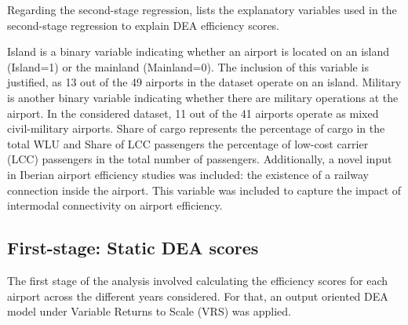 Regarding the second-stage regression,  lists the explanatory variables used in the second-stage regression to explain DEA efficiency scores.

\vspace{-0.2cm}
\begin{table}[h!]
  \begin{center}
        \caption{Summary Statistics for explanatory variables}
    \label{tab:exp_statistics}
  \end{center}
\end{table}
  
\vspace{-0.5cm}
Island is a binary variable indicating whether an airport is located on an island (Island=1) or the
mainland (Mainland=0). The inclusion of this variable is justified, as 13 out of the 49 airports in the
dataset operate on an island. Military is another binary variable indicating whether there are military
operations at the airport. In the considered dataset, 11 out of the 41 airports operate as mixed civil-military airports.
Share of cargo represents the percentage of cargo in the total WLU and Share of LCC passengers the percentage of low-cost carrier (LCC) passengers in the total
number of passengers. 
Additionally, a novel input in Iberian airport efficiency studies was included: the existence of a railway connection inside the airport. This variable was included to capture the impact of intermodal connectivity on airport efficiency.







\subsection{First-stage: Static DEA scores}
\label{subsec:resul_dea}  
The first stage of the analysis involved calculating the efficiency scores for each airport across the
different years considered. For that, an output oriented DEA model under Variable Returns to Scale
(VRS) was applied.

